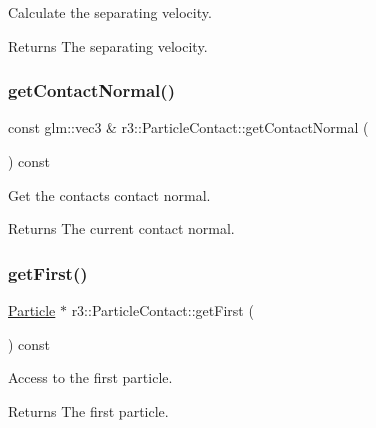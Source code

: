 Calculate the separating velocity. 

\begin{DoxyReturn}{Returns}
The separating velocity. 
\end{DoxyReturn}
\mbox{\label{classr3_1_1_particle_contact_a35b1266f0ebc69fe67dbceaf4ad4c2a0}} 
\subsubsection{\texorpdfstring{get\+Contact\+Normal()}{getContactNormal()}}
{\footnotesize\ttfamily const glm\+::vec3 \& r3\+::\+Particle\+Contact\+::get\+Contact\+Normal (\begin{DoxyParamCaption}{ }\end{DoxyParamCaption}) const}



Get the contact\textquotesingle{}s contact normal. 

\begin{DoxyReturn}{Returns}
The current contact normal. 
\end{DoxyReturn}
\mbox{\label{classr3_1_1_particle_contact_a4f82d0a6a21ea6582be9cec146fc7234}} 
\subsubsection{\texorpdfstring{get\+First()}{getFirst()}}
{\footnotesize\ttfamily \mbox{\hyperlink{classr3_1_1_particle}{Particle}} $\ast$ r3\+::\+Particle\+Contact\+::get\+First (\begin{DoxyParamCaption}{ }\end{DoxyParamCaption}) const}



Access to the first particle. 

\begin{DoxyReturn}{Returns}
The first particle. 
\end{DoxyReturn}
\mbox{\label{classr3_1_1_particle_contact_af56ceb020653556811766410119351fa}} 
